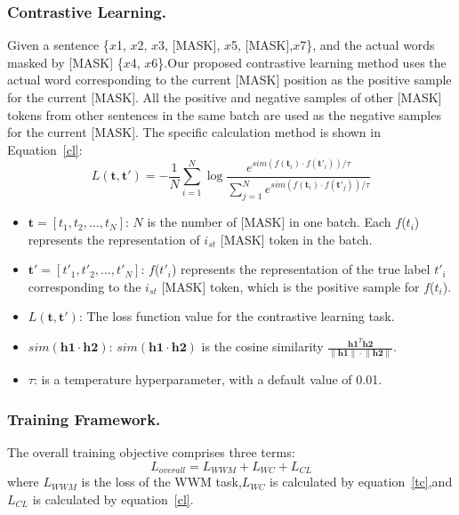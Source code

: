 \subsubsection{Contrastive Learning.}
Given a sentence \{$x${\tiny 1}, $x${\tiny 2}, $x${\tiny 3}, [MASK], $x${\tiny 5}, [MASK],$x${\tiny 7}\}, and the actual words masked by [MASK] \{$x${\tiny 4}, $x${\tiny 6}\}.Our proposed contrastive learning method uses the actual word corresponding to the current [MASK] position as the positive sample for the current [MASK]. All the positive and negative samples of other [MASK] tokens from other sentences in the same batch are used as the negative samples for the current [MASK]. The specific calculation method is shown in Equation~\ref{cl}:
\begin{equation}
	\label{cl}
	L(\mathbf{t}, \mathbf{t'}) = -\frac{1}{N} \sum_{i=1}^{N} \log \frac{e^{sim(f(\mathbf{t}_i) \cdot f(\mathbf{t'}_i))/\tau}}{\sum_{j=1}^{N} e^{sim(f(\mathbf{t}_i) \cdot f(\mathbf{t'}_j))/\tau}}
\end{equation}
\begin{itemize}
	\item $\mathbf{t} = [t_1, t_2, \ldots, t_N]$: $N$ is the number of [MASK] in one batch. Each $f$($t_i$) represents the representation of $i_{st}$ [MASK] token in the batch.
	\item $\mathbf{t'} = [t'_1, t'_2, \ldots, t'_N]$: $f$($t'_i$) represents the representation of the true label $t'_i$ corresponding to the $i_{st}$ [MASK] token, which is the positive sample for $f$($t_i$).
	\item $L(\mathbf{t}, \mathbf{t'})$: The loss function value for the contrastive learning task.
	\item \(sim(\mathbf{h1} \cdot \mathbf{h2})\): \(sim(\mathbf{h1} \cdot \mathbf{h2})\) is the cosine similarity \(\tfrac{\mathbf{h1}^T\mathbf{h2}}{\lVert \mathbf{h1} \rVert \cdot \lVert \mathbf{h2} \rVert}\).
	\item \(\tau\): is a temperature hyperparameter, with a default value of 0.01.
\end{itemize}
\subsubsection{Training Framework.}
The overall training objective comprises three terms:
\begin{equation}
	\label{allloss}
	L_{overall} = L_{WWM} + L_{WC} + L_{CL} 
\end{equation}
where \(L_{WWM}\) is the loss of the WWM task,\(L_{WC}\) is calculated by equation~\ref{tc},and \(L_{CL}\) is calculated by equation~\ref{cl}.


